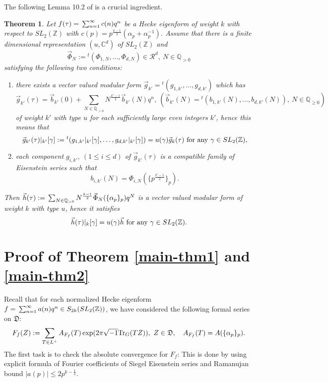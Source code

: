 \documentclass[11pt]{amsart}
\numberwithin{equation}{section}
\newtheorem{theorem}{Theorem}[section]
\theoremstyle{definition}
\begin{document}
The following Lemma 10.2 of \cite{Ik2} is a crucial ingredient.
\begin{theorem}\label{ikeda-lem} Let $f(\tau)={\displaystyle}\sum_{n=1}^\infty c(n)q^n$ be a Hecke eigenform of weight $k$ with respect to $SL_2({\mathbb{Z}})$ with
$c(p)=p^{\frac{k-1}{2}}(\alpha_p+\alpha^{-1}_p)$.
Assume that there is a finite dimensional representation $(u,{\mathbb{C}}^d)$ of $SL_2({\mathbb{Z}})$ and
$$\vec{\Phi}_N:={}^t(\Phi_{1,N},\ldots,\Phi_{d,N})\in\mathcal R^d,\ N\in{\mathbb{Q}}_{>0}$$ satisfying the following two conditions:
\begin{enumerate}
\item there exists a vector valued modular form $\vec{g}_{k'}={}^t(g_{1,k'},\ldots,g_{d,k'})$ which has
$$\vec{g}_{k'}(\tau)=\vec{b}_{k'}(0)+\sum_{N\in{\mathbb{Q}}_{>0}} N^{\frac{k'-1}{2}} \vec{b}_{k'}(N) q^n,\  (\vec{b}_{k'}(N)=
{}^t(b_{1,k'}(N),\ldots,b_{d,k'}(N)),\ N\in {\mathbb{Q}}_{\ge 0})$$ of weight $k'$ with type $u$
for each sufficiently large even integers $k'$, hence this means that
$$\vec{g}_{k'}(\tau)|_{k'}[\gamma]:={}^t(g_{1,k'}|_{k'}[\gamma],\ldots,g_{d,k'}|_{k'}[\gamma])=
u(\gamma)\vec{g}_{k}(\tau)\ {\rm for\ any}\ \gamma\in SL_2({\mathbb{Z}}),$$
\item each component $g_{i,k'},\ (1\le i\le d)$ of $\vec{g}_{k'}(\tau)$ is a compatible family of Eisenstein series such that $$b_{i,k'}(N)=\Phi_{i,N}(\{p^{\frac{k'-1}{2}}\}_p).$$
\end{enumerate}
Then $\vec{h}(\tau):={\displaystyle}\sum_{N\in{\mathbb{Q}}_{>0}} N^{\frac{k-1}{2}} \vec{\Phi}_{N}(\{\alpha_p\}_p) q^N$ is
a vector valued modular form of weight $k$ with type $u$, hence it satisfies
$$\vec{h}(\tau)|_{k}[\gamma]=u(\gamma)\vec{h}\ {\rm for\ any}\ \gamma\in SL_2({\mathbb{Z}}).$$
\end{theorem}

\section{Proof of Theorem \ref{main-thm1} and \ref{main-thm2}}
Recall that for each normalized Hecke eigenform $f={\displaystyle}\sum_{n=1}^\infty a(n)q^n\in S_{2k}(SL_2({\mathbb{Z}}))$, we have considered the following formal series on ${\mathfrak{D}}$:
$$F_f(Z):=\sum_{T\in L^+} A_{F_f}(T)\exp(2\pi\sqrt{-1}{{\rm Tr}}_G(TZ)),\ Z\in \frak D, \quad
A_{F_f}(T)=A(\{\alpha_p\}_p).
$$
The first task is to check the absolute convergence for $F_f$:
This is done by using explicit formula of Fourier coefficients of Siegel Eisenstein series and
Ramanujan bound $|a(p)|\le 2p^{k-\frac{1}{2}}$.
\end{document}
